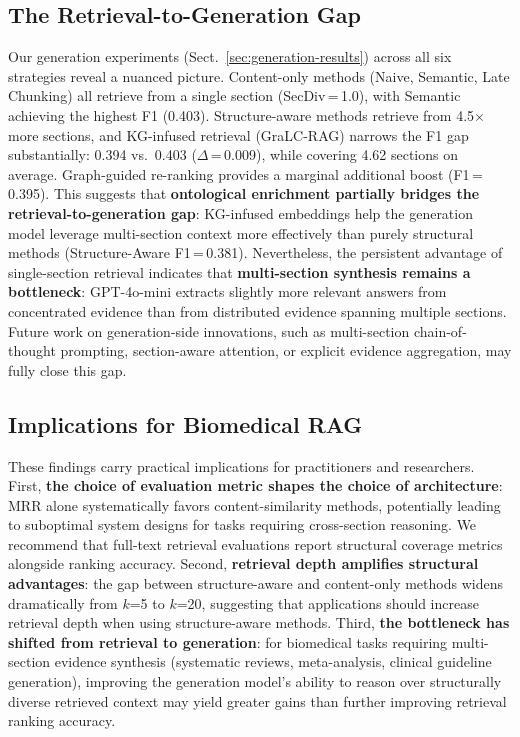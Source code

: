\documentclass[sn-basic]{sn-jnl}
\newcommand{\gralcrag}{GraLC-RAG}
\begin{document}
\subsection{The Retrieval-to-Generation Gap}

Our generation experiments (Sect.~\ref{sec:generation-results}) across all six strategies reveal a nuanced picture. Content-only methods (Naive, Semantic, Late Chunking) all retrieve from a single section (SecDiv\,=\,1.0), with Semantic achieving the highest F1 (0.403). Structure-aware methods retrieve from 4.5$\times$ more sections, and KG-infused retrieval (\gralcrag{}) narrows the F1 gap substantially: 0.394 vs.\ 0.403 ($\Delta$\,=\,0.009), while covering 4.62 sections on average. Graph-guided re-ranking provides a marginal additional boost (F1\,=\,0.395). This suggests that \textbf{ontological enrichment partially bridges the retrieval-to-generation gap}: KG-infused embeddings help the generation model leverage multi-section context more effectively than purely structural methods (Structure-Aware F1\,=\,0.381). Nevertheless, the persistent advantage of single-section retrieval indicates that \textbf{multi-section synthesis remains a bottleneck}: GPT-4o-mini extracts slightly more relevant answers from concentrated evidence than from distributed evidence spanning multiple sections. Future work on generation-side innovations, such as multi-section chain-of-thought prompting, section-aware attention, or explicit evidence aggregation, may fully close this gap.

\subsection{Implications for Biomedical RAG}

These findings carry practical implications for practitioners and researchers. First, \textbf{the choice of evaluation metric shapes the choice of architecture}: MRR alone systematically favors content-similarity methods, potentially leading to suboptimal system designs for tasks requiring cross-section reasoning. We recommend that full-text retrieval evaluations report structural coverage metrics alongside ranking accuracy. Second, \textbf{retrieval depth amplifies structural advantages}: the gap between structure-aware and content-only methods widens dramatically from $k$=5 to $k$=20, suggesting that applications should increase retrieval depth when using structure-aware methods. Third, \textbf{the bottleneck has shifted from retrieval to generation}: for biomedical tasks requiring multi-section evidence synthesis (systematic reviews, meta-analysis, clinical guideline generation), improving the generation model's ability to reason over structurally diverse retrieved context may yield greater gains than further improving retrieval ranking accuracy.
\end{document}
